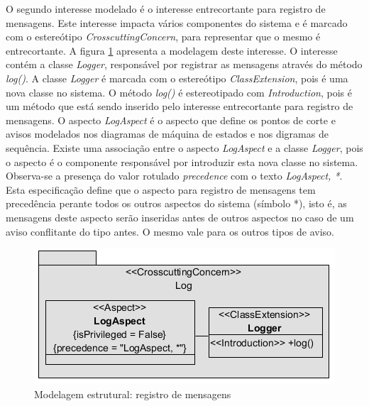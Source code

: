 O segundo interesse modelado é o interesse entrecortante para registro de mensagens. Este interesse impacta vários componentes do sistema e é
marcado com o estereótipo \textit{CrosscuttingConcern}, para representar que o mesmo é entrecortante. A figura \ref{fig:case_study_structural_log}
apresenta a modelagem deste interesse. O interesse contém a classe \textit{Logger}, responsável por registrar as mensagens através do método
\textit{log()}. A classe \textit{Logger} é marcada com o estereótipo \textit{ClassExtension}, pois é uma nova classe no sistema. O método
\textit{log()} é estereotipado com \textit{Introduction}, pois é um método que está sendo inserido pelo interesse entrecortante para registro de mensagens. 
O aspecto \textit{LogAspect} é o aspecto que define os pontos de corte e avisos modelados nos diagramas de máquina de estados e nos digramas de
sequência. Existe uma associação entre o aspecto \textit{LogAspect} e a classe \textit{Logger}, pois o aspecto é o componente responsável por introduzir esta 
nova classe no sistema. Observa-se a presença do valor rotulado \textit{precedence} com o texto \textit{LogAspect, *}. Esta especificação define que o
aspecto para registro de mensagens tem precedência perante todos os outros aspectos do sistema (símbolo *), isto é, as mensagens deste aspecto serão
inseridas antes de outros aspectos no caso de um aviso conflitante do tipo antes. O mesmo vale para os outros tipos de aviso.

  \begin{figure}
	\centering
	\includegraphics{img/case_study_structural_log.png}
	\caption{Modelagem estrutural: registro de mensagens}\label{fig:case_study_structural_log}
  \end{figure}

